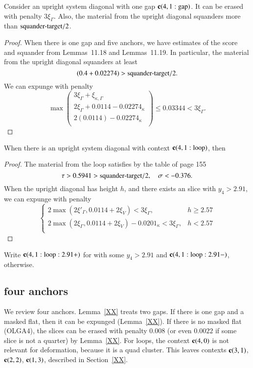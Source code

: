 \begin{lemma}
Consider an upright system diagonal with one gap ${\operatorname{\bf c}}{(4,1:{\operatorname{gap}})}$.
It can be erased with penalty $3\xi_\Gamma$.  Also, the material
from the upright diagonal squanders more than ${\operatorname{squander-target}}/2$.
\end{lemma}

\begin{proof}
 When there is one gap and five anchors, we have estimates of the score and squander
from Lemmas~11.18 and Lemmas~11.19.  
In particular, the material from the upright diagonal squanders at least 
  $$(0.4 + 0.02274) > {\operatorname{squander-target}}/2.$$  
We can expunge with penalty
  $$\max \left(\begin{array}{lll}
  3\xi_\Gamma + \xi_{\kappa,\Gamma}\\
  2\xi_\Gamma + 0.0114 - 0.02274_\kappa\\
  2 (0.0114) - 0.02274_\kappa\\
  \end{array}
   \right)\le 0.03344 < 3\xi_\Gamma.$$
\end{proof}
  
\begin{lemma}  When there is an upright system diagonal with context
${\operatorname{\bf c}}{(4,1:{\operatorname{loop}})}$, then 
\end{lemma}

\begin{proof}
The material from the loop satisfies by the table
of page 155
  $$
  \tau > 0.5941 > {\operatorname{squander-target}}/2,\quad \sigma < -0.376.
  $$
When the upright diagonal has height $h$, and there exists an slice
with $y_4 > 2.91$, we can expunge with penalty
  $$
  \begin{cases}
  2 \max(2\xi'_\Gamma,0.0114+2\xi_V) < 3\xi_\Gamma, & h \ge 2.57\\
  2 \max(2\xi_\Gamma,0.0114+2\xi_V) - 0.0201_\kappa < 3 \xi_\Gamma, & h < 2.57\\
  \end{cases}
  $$
\end{proof}

Write ${\operatorname{\bf c}}{(4,1:{\operatorname{loop}}:2.91+)}$ for with some $y_4 > 2.91$ and ${\operatorname{\bf c}}{(4,1:{\operatorname{loop}}:2.91-)}$, otherwise.

\subsection{four anchors}

We review four anchors.
Lemma~\ref{XX} %
treats two  gaps.  If there is one  gap and a masked flat, then it can be expunged (Lemma~\ref{XX}).  %
If there
is no masked flat (OLGA4), 
the slices can be erased with penalty $0.008$ (or even $0.0022$ if some slice is not a quarter) by Lemma~\ref{XX}. %
For loops, the context ${\operatorname{\bf c}}{(4,0)}$
is not relevant for deformation, because it is a quad cluster.  This leaves contexts ${\operatorname{\bf c}}{(3,1)}$, ${\operatorname{\bf c}}{(2,2)}$, ${\operatorname{\bf c}}{(1,3)}$, 
described in Section~\ref{XX}. 


